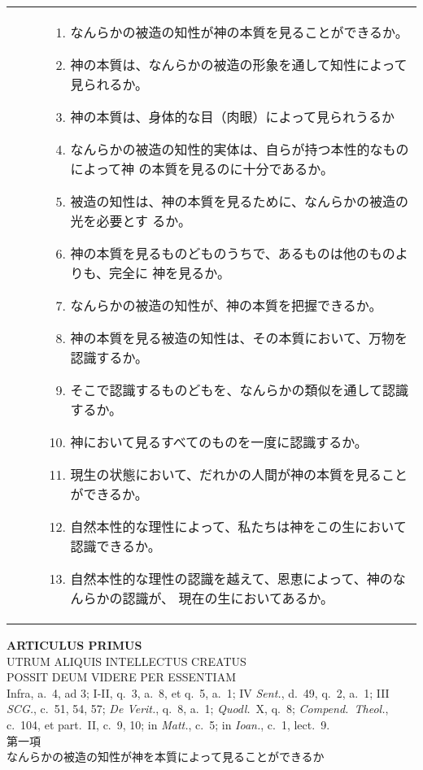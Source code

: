 \documentclass[10pt]{jsarticle} %
\begin{document}
\begin{longtable}{p{21em}p{21em}}
\begin{enumerate}
\end{enumerate}

&

\begin{enumerate}
 \item なんらかの被造の知性が神の本質を見ることができるか。
 \item 神の本質は、なんらかの被造の形象を通して知性によって見られるか。
 \item 神の本質は、身体的な目（肉眼）によって見られうるか
 \item なんらかの被造の知性的実体は、自らが持つ本性的なものによって神
       の本質を見るのに十分であるか。
 \item 被造の知性は、神の本質を見るために、なんらかの被造の光を必要とす
       るか。
 \item 神の本質を見るものどものうちで、あるものは他のものよりも、完全に
       神を見るか。
 \item なんらかの被造の知性が、神の本質を把握できるか。
 \item 神の本質を見る被造の知性は、その本質において、万物を認識するか。
 \item そこで認識するものどもを、なんらかの類似を通して認識するか。
 \item 神において見るすべてのものを一度に認識するか。
 \item 現生の状態において、だれかの人間が神の本質を見ることができるか。
 \item 自然本性的な理性によって、私たちは神をこの生において認識できるか。
 \item 自然本性的な理性の認識を越えて、恩恵によって、神のなんらかの認識が、
       現在の生においてあるか。
\end{enumerate}
\end{longtable}

\newpage


\begin{center}
{\Large {\bfseries ARTICULUS PRIMUS}}\\
{\large UTRUM ALIQUIS INTELLECTUS CREATUS\\ POSSIT DEUM VIDERE PER
 ESSENTIAM}\\
{\footnotesize Infra, a.~4, ad 3; I-II, q.~3, a.~8, et q.~5, a.~1; IV
 {\itshape Sent.}, d.~49, q.~2, a.~1; III {\itshape SCG.}, c.~51, 54,
 57; {\itshape De Verit.}, q.~8, a.~1; {\itshape Quodl.}~X, q.~8;
 {\itshape Compend.~Theol.}, c.~104, et part.~II, c.~9, 10; in {\itshape
 Matt.}, c.~5; in {\itshape Ioan.}, c.~1, lect.~9.}\\
{\Large 第一項\\なんらかの被造の知性が神を本質によって見ることができるか}
\end{center}
\end{document}
